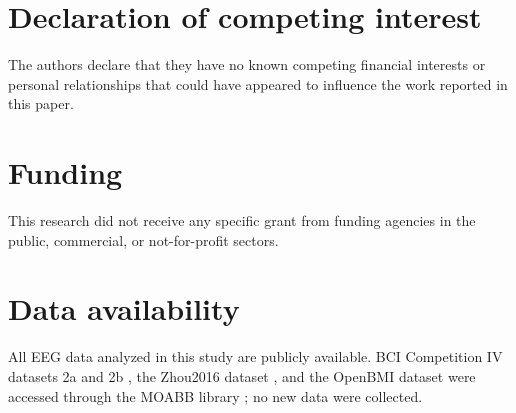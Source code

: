 \documentclass[preprint,12pt]{elsarticle}
\begin{document}
\section*{Declaration of competing interest}
The authors declare that they have no known competing financial interests or personal relationships that could have appeared to influence the work reported in this paper.

\section*{Funding}
This research did not receive any specific grant from funding agencies in the public, commercial, or not-for-profit sectors.

\section*{Data availability}
All EEG data analyzed in this study are publicly available. BCI Competition IV datasets 2a and 2b \cite{tangermann2012review}, the Zhou2016 dataset \cite{zhou2016trialselection}, and the OpenBMI dataset \cite{lee2019openbmi} were accessed through the MOABB library \cite{jayaram2018moabb}; no new data were collected.



\end{document}

